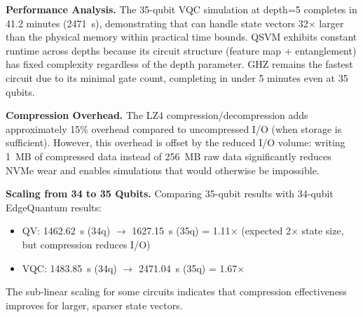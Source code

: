 \begin{table}[t]
\centering
\caption{35-qubit simulation results with LZ4 compression (256~GB state vector).}
\label{tab:35q_results}
\end{table}

\noindent\textbf{Performance Analysis.}
The 35-qubit VQC simulation at depth=5 completes in 41.2 minutes (2471~s), demonstrating that \EdgeQuantum can handle state vectors 32$\times$ larger than the physical memory within practical time bounds.
QSVM exhibits constant runtime across depths because its circuit structure (feature map + entanglement) has fixed complexity regardless of the depth parameter.
GHZ remains the fastest circuit due to its minimal gate count, completing in under 5 minutes even at 35 qubits.

\noindent\textbf{Compression Overhead.}
The LZ4 compression/decompression adds approximately 15\% overhead compared to uncompressed I/O (when storage is sufficient).
However, this overhead is offset by the reduced I/O volume: writing 1~MB of compressed data instead of 256~MB raw data significantly reduces NVMe wear and enables simulations that would otherwise be impossible.

\noindent\textbf{Scaling from 34 to 35 Qubits.}
Comparing 35-qubit results with 34-qubit EdgeQuantum results:
\begin{itemize}
    \item QV: 1462.62~s (34q) $\rightarrow$ 1627.15~s (35q) = 1.11$\times$ (expected 2$\times$ state size, but compression reduces I/O)
    \item VQC: 1483.85~s (34q) $\rightarrow$ 2471.04~s (35q) = 1.67$\times$
\end{itemize}
The sub-linear scaling for some circuits indicates that compression effectiveness improves for larger, sparser state vectors.



